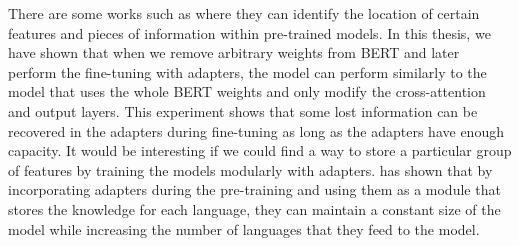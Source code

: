 There are some works such as  where they can identify the location of certain features and pieces of information within pre-trained models. In this thesis, we have shown that when we remove arbitrary weights from BERT and later perform the fine-tuning with adapters, the model can perform similarly to the model that uses the whole BERT weights and only modify the cross-attention and output layers. This experiment shows that some lost information can be recovered in the adapters during fine-tuning as long as the adapters have enough capacity. It would be interesting if we could find a way to store a particular group of features by training the models modularly with adapters.  has shown that by incorporating adapters during the pre-training and using them as a module that stores the knowledge for each language, they can maintain a constant size of the model while increasing the number of languages that they feed to the model.
